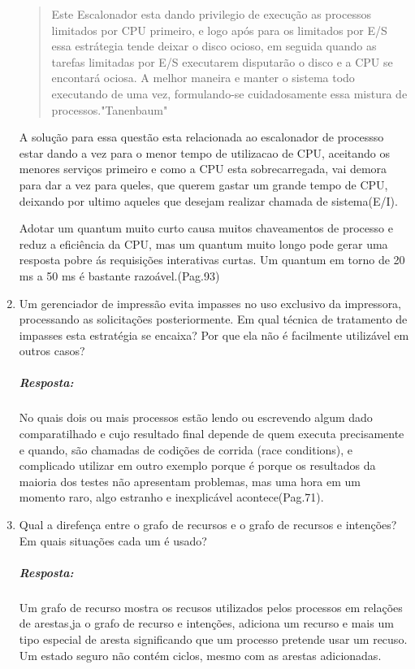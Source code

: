 \documentclass[12pt]{article}
\begin{document}
\begin{enumerate}
 \begin{quote}
Este Escalonador esta dando privilegio de execução as processos limitados por CPU primeiro, e logo após para os limitados por E/S essa estrátegia tende deixar o disco ocioso, em seguida quando as tarefas limitadas por E/S executarem disputarão o disco e a CPU se encontará ociosa. A melhor maneira e manter o sistema todo executando de uma vez, formulando-se cuidadosamente essa mistura de processos."Tanenbaum"	 	
 \end{quote}
	 
	 
 A solução para essa questão esta relacionada ao escalonador de processso estar dando a vez para o menor tempo de utilizacao de CPU, aceitando os menores serviços primeiro e como a CPU esta sobrecarregada, vai demora para dar a vez para queles, que querem gastar um grande tempo de CPU, deixando por ultimo aqueles que desejam realizar chamada de sistema(E/I).
	 
Adotar um quantum muito curto causa  muitos chaveamentos de processo e reduz a eficiência da CPU, mas um quantum muito longo pode gerar uma resposta pobre ás requisições interativas curtas. Um quantum em torno de 20 ms a 50 ms é bastante razoável.(Pag.93)
\item
Um gerenciador de impressão evita impasses no uso exclusivo da
impressora, processando as solicitações posteriormente. Em qual
técnica de tratamento de impasses esta estratégia se encaixa? Por que
ela não é facilmente utilizável em outros casos?
 \subparagraph{Resposta:}
 No quais dois ou mais processos estão lendo ou escrevendo algum dado comparatilhado e cujo resultado final depende de quem executa precisamente e quando, são chamadas de codições de corrida (race conditions), e complicado utilizar em outro exemplo porque é porque os resultados da maioria dos testes não apresentam problemas, mas uma hora em um momento raro, algo estranho e inexplicável acontece(Pag.71).
 
\item
Qual a direfença entre o grafo de recursos e o grafo de recursos e
intenções? Em quais situações cada um é usado?
 \subparagraph{Resposta:}
	Um grafo de recurso mostra os recusos utilizados pelos processos em relações de arestas,ja o grafo de recurso e intenções, adiciona um recurso e mais um tipo especial de aresta significando que um processo pretende usar um recuso. Um estado seguro não contém ciclos, mesmo com as arestas adicionadas. 
 

\end{enumerate}
\end{document}
